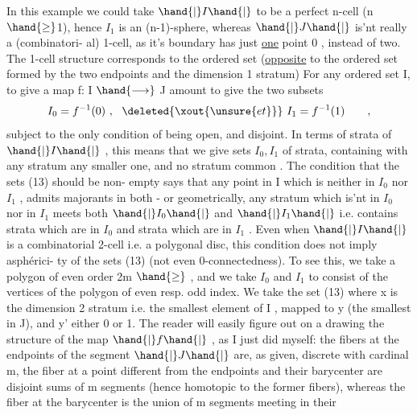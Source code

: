In this example we could take $\hand{|}I\hand{|}$ to be a perfect n-cell (n$\hand{\geq}$1),
hence  $I_1$  is an (n-1)-sphere,  whereas $\hand{|}J\hand{|}$ is'nt really a (combinatori-%
al) 1-cell,  as it's boundary has just \uline{one} point 0 ,  instead of two.
The 1-cell structure corresponds to the ordered set (\uline{opposite} to the
ordered set formed by the two endpoints and the dimension 1 stratum)
\diagram{\[ J = \begin{tikzcd}[row sep=small, column sep=small] & \hand{y} \ar[dl, "\hand{}"'] \ar[dr, "\hand{}"] & \\ 0 & & 1 \end{tikzcd} \quad . \]}
For any ordered set I,  to give a map  f: I $\hand{\longrightarrow}$ J  amount to give
the two subsets
\[ I_0 = f^{-1}(0) \ , \ \ \deleted{\xout{\unsure{et}}}\ I_1 = f^{-1}(1) \qquad , \]
subject to the only condition of being open,  and disjoint.  In terms
of strata of $\hand{|}I\hand{|}$ ,  this means that we give  sets $I_0,I_1$ of strata,
containing with any stratum any smaller one,  and  no stratum 
common .  The condition that the sets (13) should be non-%
empty says that any point in I which is neither in $I_0$ nor $I_1$ , admits
majorants in both  -  or geometrically,  any stratum which is'nt in
$I_0$ nor in $I_1$ meets both $\hand{|}I_0\hand{|}$ and $\hand{|}I_1\hand{|}$ i.e. contains strata which are
in $I_0$ and strata which are in $I_1$ .   Even when $\hand{|}I\hand{|}$ is a combinatorial
2-cell i.e. a polygonal disc,  this condition does not imply asphérici-%
ty of the sets (13) (not even 0-connectedness).  To see this,  we take
a polygon of even order 2m $\hand{\geq}$ ,  and we take  $I_0$ and $I_1$ to consist
of the vertices of the polygon of even resp. odd index.  We take the
set (13) where x is the dimension 2 stratum  i.e. the  smallest
element of I ,  mapped to y (the smallest in J),  and y' either 0 or 1.
The reader will easily figure out on a drawing the structure of the
map $\hand{|}f\hand{|}$ ,  as I just did myself:  the fibers at the endpoints of the
segment $\hand{|}J\hand{|}$ are,  as given,  discrete with cardinal m,  the fiber at
a point different from the endpoints and  their barycenter are disjoint
sums of m segments (hence homotopic to the former fibers),  whereas
the fiber at the barycenter is the union of m segments meeting in their

